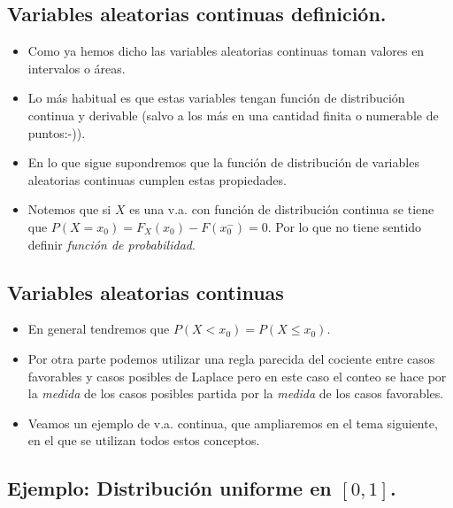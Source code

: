 \documentclass[]{book}
\providecommand{\tightlist}{%
  \setlength{\itemsep}{0pt}\setlength{\parskip}{0pt}}
\begin{document}
\hypertarget{variables-aleatorias-continuas-definiciuxf3n.}{%
\subsection{Variables aleatorias continuas definición.}\label{variables-aleatorias-continuas-definiciuxf3n.}}

\begin{itemize}
\tightlist
\item
  Como ya hemos dicho las variables aleatorias continuas toman valores en
  intervalos o áreas.
\item
  Lo más habitual es que estas variables tengan función de distribución continua y
  derivable (salvo a los más en una cantidad finita o numerable de puntos:-)).
\item
  En lo que sigue supondremos que la función de distribución de variables
  aleatorias continuas cumplen estas propiedades.
\item
  Notemos que si \(X\) es una v.a. con función de distribución continua se tiene que
  \(P(X=x_0)=F_X(x_0)-F(x_0^{-})=0\). Por lo que no tiene sentido definir \emph{función de probabilidad}.
\end{itemize}

\hypertarget{variables-aleatorias-continuas-1}{%
\subsection{Variables aleatorias continuas}\label{variables-aleatorias-continuas-1}}

\begin{itemize}
\tightlist
\item
  En general tendremos que \(P(X<x_0)=P(X\leq x_0)\).
\item
  Por otra parte podemos utilizar una regla parecida del
  cociente entre casos favorables y casos posibles de Laplace pero en
  este caso el conteo se hace por la \emph{medida} de los casos
  posibles partida por la \emph{medida} de los casos favorables.
\item
  Veamos un ejemplo de v.a. continua, que ampliaremos en el tema siguiente, en el que se utilizan todos estos conceptos.
\end{itemize}

\hypertarget{ejemplo-distribuciuxf3n-uniforme-en-01.}{%
\subsection{\texorpdfstring{Ejemplo: Distribución uniforme en \([0,1]\).}{Ejemplo: Distribución uniforme en {[}0,1{]}.}}\label{ejemplo-distribuciuxf3n-uniforme-en-01.}}
\end{document}
